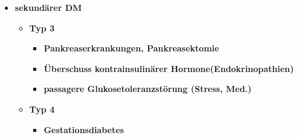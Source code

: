 \begin{itemize}
\begin{itemize}
				\end{itemize}
			\item \textbf{sekundärer DM}
				\begin{itemize}
					\item \textbf{Typ 3}
						\begin{itemize}
							\item \textbf{Pankreaserkrankungen, Pankreasektomie}
							\item \textbf{Überschuss kontrainsulinärer Hormone(Endokrinopathien)}
							\item \textbf{passagere Glukosetoleranzstörung (Stress, Med.)}
						\end{itemize}
					\item \textbf{Typ 4}
						\begin{itemize}
							\item \textbf{Gestationsdiabetes}
						\end{itemize}
				\end{itemize}
		\end{itemize}
